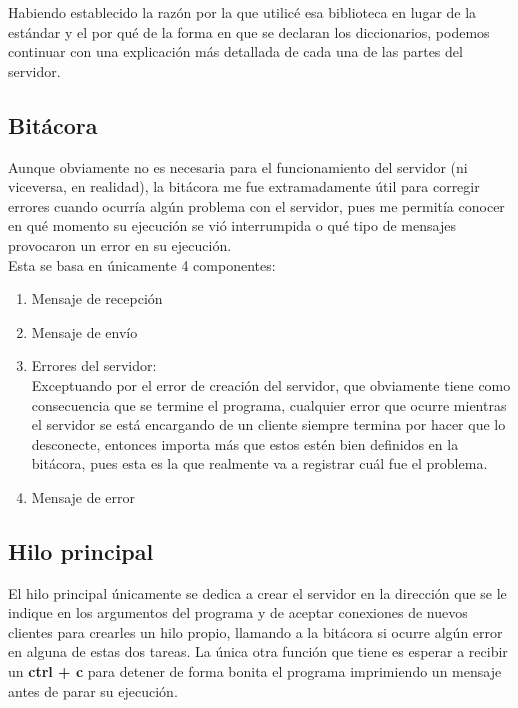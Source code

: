 \documentclass[11pt]{article}
\begin{document}
Habiendo establecido la razón por la que utilicé esa biblioteca en lugar de la estándar y el por qué de la forma en que se declaran los diccionarios, podemos continuar con una explicación más detallada de cada una de las partes del servidor.

\subsection{Bitácora}
Aunque obviamente no es necesaria para el funcionamiento del servidor (ni viceversa, en realidad), la bitácora me fue extramadamente útil para corregir errores cuando ocurría algún problema con el servidor, pues me permitía conocer en qué momento su ejecución se vió interrumpida o qué tipo de mensajes provocaron un error en su ejecución.\\
Esta se basa en únicamente 4 componentes: 
\begin{enumerate}
    \item Mensaje de recepción
    \item Mensaje de envío
    \item Errores del servidor:\\
    Exceptuando por el error de creación del servidor, que obviamente tiene como consecuencia que se termine el programa, cualquier error que ocurre mientras el servidor se está encargando de un cliente siempre termina por hacer que lo desconecte, entonces importa más que estos estén bien definidos en la bitácora, pues esta es la que realmente va a registrar cuál fue el problema.
    \item Mensaje de error
\end{enumerate}

\subsection{Hilo principal}
El hilo principal únicamente se dedica a crear el servidor en la dirección que se le indique en los argumentos del programa y de aceptar conexiones de nuevos clientes para crearles un hilo propio, llamando a la bitácora si ocurre algún error en alguna de estas dos tareas. La única otra función que tiene es esperar a recibir un \textbf{ctrl + c} para detener de forma bonita el programa imprimiendo un mensaje antes de parar su ejecución.
\end{document}
